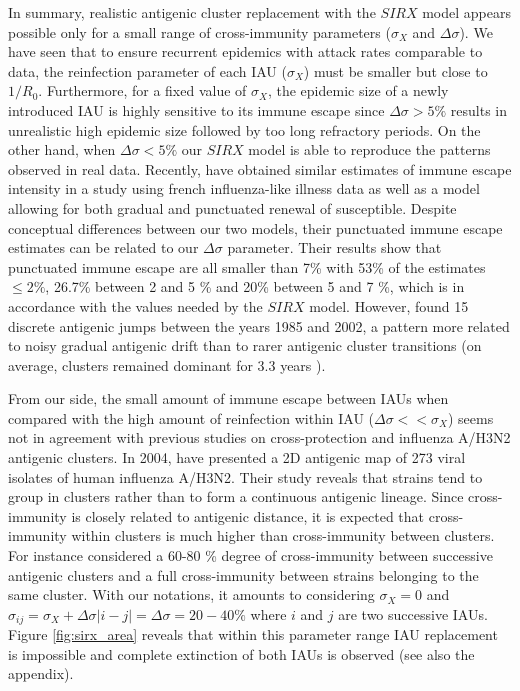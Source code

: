 In summary, realistic antigenic cluster replacement with the $SIRX$
model appears possible only for a small range of cross-immunity
parameters ($\sigma_{X}$ and $\Delta\sigma$). We have seen that to
ensure recurrent epidemics with attack rates comparable to data, the
reinfection parameter of each IAU ($\sigma_{X}$) must be smaller but
close to $1/R_0$. Furthermore, for a fixed value of $\sigma_{X}$, the
epidemic size of a newly introduced IAU is highly sensitive to its
immune escape since $\Delta\sigma>5\%$ results in unrealistic high
epidemic size followed by too long refractory periods. On the other
hand, when $\Delta\sigma< 5 \%$ our $SIRX$ model is able to reproduce
the patterns observed in real data. Recently, \citet{Finkenstaedt2005}
have obtained similar estimates of immune escape intensity in a study
using french influenza-like illness data as well as a model allowing
for both gradual and punctuated renewal of susceptible. Despite
conceptual differences between our two models, their punctuated immune
escape estimates can be related to our $\Delta\sigma$ parameter. Their
results show that punctuated immune escape are all smaller than 7\%
with 53\% of the estimates $\leq 2\%$, 26.7\% between 2 and 5 \% and
20\% between 5 and 7 \%, which is in accordance with the values needed
by the $SIRX$ model. However, \citet{Finkenstaedt2005} found 15
discrete antigenic jumps between the years 1985 and 2002, a pattern
more related to noisy gradual antigenic drift than to rarer antigenic
cluster transitions (on average, clusters remained dominant for 3.3
years \citep{Smith2004}).

From our side, the small amount of immune escape between IAUs when
compared with the high amount of reinfection within IAU ($\Delta\sigma
<< \sigma_{X}$) seems not in agreement with previous studies on
cross-protection and influenza A/H3N2 antigenic clusters. In 2004,
\citeauthor{Smith2004} have presented a 2D antigenic map of 273 viral
isolates of human influenza A/H3N2. Their study reveals that strains
tend to group in clusters rather than to form a continuous antigenic
lineage. Since cross-immunity is closely related to antigenic
distance, it is expected that cross-immunity within clusters is much
higher than cross-immunity between clusters. For instance
\citet{Koelle2009} considered a 60-80 \% degree of cross-immunity
between successive antigenic clusters and a full cross-immunity
between strains belonging to the same cluster. With our notations, it
amounts to considering $\sigma_{X}=0$ and
$\sigma_{ij}=\sigma_{X}+\Delta\sigma|i-j|=\Delta\sigma=20-40\%$ where
$i$ and $j$ are two successive IAUs. Figure \ref{fig:sirx_area}
reveals that within this parameter range IAU replacement is impossible
and complete extinction of both IAUs is observed (see also the
appendix). 

